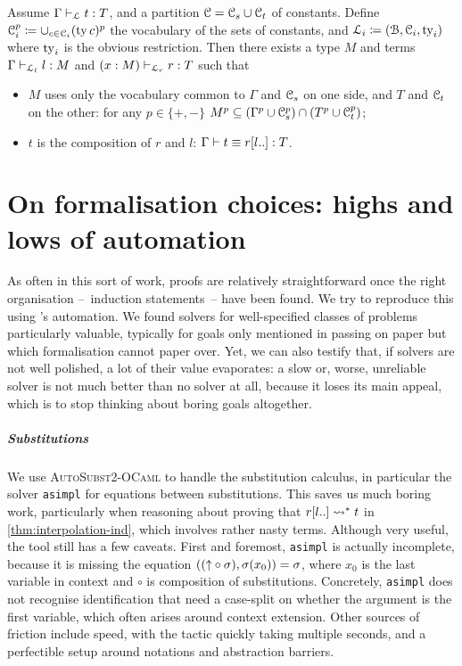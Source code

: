\documentclass[a4paper,UKenglish,cleveref, autoref, thm-restate]{lipics-v2021}
\begin{document}
\begin{theorem}
  Assume \(\typing[\lang]{\Gamma}{t}[T]\), and a partition
  \(\mathcal{C} = \mathcal{C}_{s} \cup \mathcal{C}_{t}\) of constants.
  Define \(\mathcal{C}_{i}^p \coloneq \cup_{c \in \mathcal{C}_{i}} (\operatorname{ty} c)^p\)
    the vocabulary of the sets of constants, and
    \(\mathcal{L}_{i} \coloneq (\mathcal{B},\mathcal{C}_{i},\operatorname{ty}_{i})\)
    where \(\operatorname{ty}_{i}\) is the obvious restriction.
  Then there exists a type \(M\) and terms
  \(\typing[\lang_{l}]{\Gamma}{l}[M]\) and \(\typing[\lang_{r}]{(x:M)}{r}[T]\) such that
  \begin{itemize}
  \item \(M\) uses only the vocabulary common to \(\Gamma\) and \(\mathcal{C}_{s}\)
    on one side, and \(T\) and \(\mathcal{C}_{t}\) on the other:
    for any \(p \in \{+,-\}\)
    \(M^p \subseteq (\Gamma^p \cup \mathcal{C}_{s}^p) \cap (T^p \cup \mathcal{C}_{t}^p)\);
  \item \(t\) is the composition of \(r\) and \(l\): \(\conv{\Gamma}{t}{\subs{r}{l..}}[T]\).
  \end{itemize}
\end{theorem}


\section{On formalisation choices: highs and lows of automation}
\label{sec:formalisation}

As often in this sort of work, proofs are relatively straightforward
once the right organisation --~\eg induction statements~-- have been found.
We try to reproduce this using \Rocq's
automation. We found solvers for well-specified classes of problems particularly
valuable, typically for goals only
mentioned in passing on paper but which formalisation cannot paper over.
Yet, we can also testify
that, if solvers are not well polished, a lot of their value evaporates:
a slow or, worse, unreliable solver is not much better than no solver at all,
because it loses its main appeal, which is to stop thinking
about boring goals altogether.

\subparagraph*{Substitutions}
 We use \textsc{AutoSubst2-OCaml}
\cite{Stark2019,Dapprich2021} to handle the substitution calculus, in particular
the solver \texttt{asimpl} for equations between substitutions.
This saves us much boring work, particularly when reasoning about
proving that \(\red{\subs{r}{l..}}{t}\) in \cref{thm:interpolation-ind}, which
involves rather nasty terms. 
Although very useful, the tool still has a few caveats. First and foremost,
\texttt{asimpl} is actually incomplete, because it is missing the equation
\(((\mathord{\uparrow} \circ \sigma),\sigma(x_0)) = \sigma\), where \(x_0\) is the last
variable in context and \(\circ\) is composition of substitutions.
Concretely, \texttt{asimpl} does not recognise identification
that need a case-split on whether the argument is the first
variable, which often arises around context extension.
Other sources of friction include speed, with the tactic
quickly taking multiple seconds, and a perfectible setup around notations
and abstraction barriers.
\end{document}
